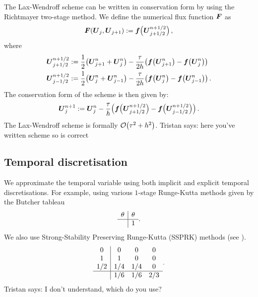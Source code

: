 \documentclass[final]{amsart}
\renewcommand{\vec}[1]{\geovec{#1}}
\newcommand{\tristan}[1]{{\color{purple} Tristan says:  #1 }}
\numberwithin{equation}{section}
\begin{document}
\begin{Rem}
  The Lax-Wendroff scheme can be written in conservation form by
        using the Richtmayer two-stage method.  We define the numerical
        flux function $\vec F$ as
	\begin{equation}\label{eq_F_LxW_cons}
	\vec F\qp{\vec U_j,\vec U_{j+1}}:= \vec f\qp{\vec U^{n+1/2}_{j+1/2}},
	\end{equation}
	where 
	\begin{equation}
	\begin{split}
	\vec U^{n+1/2}_{j+1/2}&:=\frac{1}{2}\qp{\vec U^n_{j+1} + \vec U^n_{j}}-\frac{\tau}{2h}\qp{\vec f\qp{\vec U^n_{j+1}}-\vec f\qp{\vec U^n_j}}\\
	\vec U^{n+1/2}_{j-1/2}&:=\frac{1}{2}\qp{\vec U^n_{j} + \vec U^n_{j-1}}-\frac{\tau}{2h}\qp{\vec f\qp{\vec U^n_{j}}-\vec f\qp{\vec U^n_{j-1}}}.
	\end{split}
	\end{equation}
	The conservation form of the scheme is then given by:
	\begin{equation}\label{eq_LxW_scheme}
	\vec U^{n+1}_j:= \vec  U^n_j-\frac{\tau}{h}\qp{\vec f\qp{\vec U^{n+1/2}_{j+1/2}}-\vec f\qp{\vec U^{n+1/2}_{j-1/2}}}.
	\end{equation}
	The Lax-Wendroff scheme is formally $\mathcal{O}\!\left({\tau^2 +h^2}\right)$. \tristan{here you've written scheme so is correct}
\end{Rem}


\subsection{Temporal discretisation}
We approximate the temporal variable using both implicit and explicit
temporal discretisations.  For example, using various $1$-stage Runge-Kutta methods given by the Butcher tableau
\begin{equation}
  \begin{array}
    {c|c}
    \theta & \theta
    \\
    \hline
    & 1 
  \end{array}.
\end{equation}
We also use  Strong-Stability Preserving
Runge-Kutta (SSPRK) methods (see \cite{gottlieb2001strong}).
\begin{equation}
  \begin{array}{c|ccc}0&0&0&0\\1&1&0&0\\1/2&1/4&1/4&0\\\hline &1/6&1/6&2/3\\\end{array}.
\end{equation}
\tristan{I don't understand, which do you use?}
\end{document}
